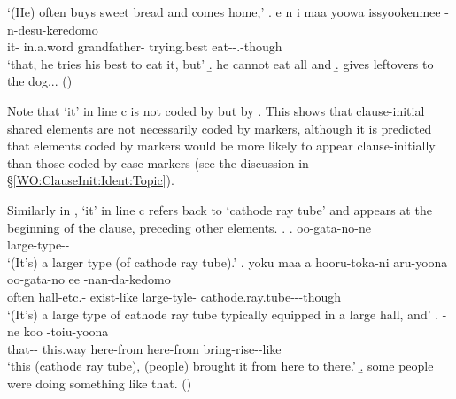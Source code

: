    `(He) often buys sweet bread and comes home,'
 \bg. e n  i maa yoowa  issyookenmee -n-desu-keredomo \\
     it-   in.a.word grandfather- trying.best eat--.-though \\
   `that, he tries his best to eat it, but'
 \b. he cannot eat all and
 \b. gives leftovers to the dog...
  \hfill{()}
%

Note that  `it' in line c is not coded by  but by .
This shows that clause-initial shared elements are not necessarily coded by  markers,
although it is predicted that elements coded by  markers would be more likely to appear clause-initially than those coded by case markers (see the discussion in \S \ref{WO:ClauseInit:Ident:Topic}).

Similarly in \Next,
 `it' in line c refers back to  `cathode ray tube'
and appears at the beginning of the clause,
preceding other elements.
%
\ex.\label{PronIni2}
 \ag. oo-gata-no-ne \\
   large-type-- \\
   `(It's) a larger type (of cathode ray tube).'
 \bg. yoku maa a hooru-toka-ni aru-yoona oo-gata-no ee {}-nan-da-kedomo \\
   often   hall-etc.- exist-like large-tyle-  cathode.ray.tube---though \\
   `(It's) a large type of cathode ray tube typically equipped in a large hall, and'
 \bg. -ne koo   -toiu-yoona \\
  that-- this.way here-from here-from bring-rise--like \\
  `this (cathode ray tube), (people) brought it from here to there.'
  \b. some people were doing something like that.
   \hfill{()}

